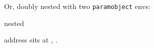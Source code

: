 \documentclass{article}
\begin{document}

    \medskip

    Or, doubly nested with two \texttt{paramobject} envs:

    \begin{paramobject}{nested}
        \begin{paramobject}{address}
            \label{} sits at \street, \city.
        \end{paramobject}
    \end{paramobject}
\end{document}
